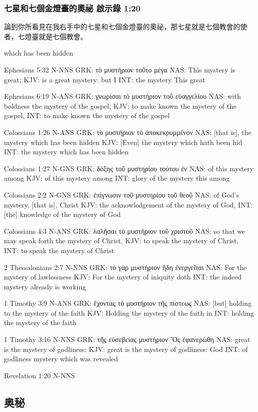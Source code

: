 \subsubsection{七星和七個金燈臺的奧祕 啟示錄 1:20}
論到你所看見在我右手中的七星和七個金燈臺的奧祕，那七星就是七個教會的使者，七燈臺就是七個教會。
 
  which has been hidden

Ephesians 5:32 N-NNS
GRK: τὸ μυστήριον τοῦτο μέγα
NAS: This mystery is great;
KJV: is a great mystery: but I
INT: the mystery This great

Ephesians 6:19 N-ANS
GRK: γνωρίσαι τὸ μυστήριον τοῦ εὐαγγελίου
NAS: with boldness the mystery of the gospel,
KJV: to make known the mystery of the gospel,
INT: to make known the mystery of the gospel

Colossians 1:26 N-ANS
GRK: τὸ μυστήριον τὸ ἀποκεκρυμμένον
NAS: [that is], the mystery which has been hidden
KJV: [Even] the mystery which hath been hid
INT: the mystery which has been hidden

Colossians 1:27 N-GNS
GRK: δόξης τοῦ μυστηρίου τούτου ἐν
NAS: of this mystery among
KJV: of this mystery among
INT: glory of the mystery this among

Colossians 2:2 N-GNS
GRK: ἐπίγνωσιν τοῦ μυστηρίου τοῦ θεοῦ
NAS: of God's mystery, [that is], Christ
KJV: the acknowledgement of the mystery of God,
INT: [the] knowledge of the mystery of God

Colossians 4:3 N-ANS
GRK: λαλῆσαι τὸ μυστήριον τοῦ χριστοῦ
NAS: so that we may speak forth the mystery of Christ,
KJV: to speak the mystery of Christ,
INT: to speak the mystery of Christ

2 Thessalonians 2:7 N-NNS
GRK: τὸ γὰρ μυστήριον ἤδη ἐνεργεῖται
NAS: For the mystery of lawlessness
KJV: For the mystery of iniquity doth
INT: the indeed mystery already is working

1 Timothy 3:9 N-ANS
GRK: ἔχοντας τὸ μυστήριον τῆς πίστεως
NAS: [but] holding to the mystery of the faith
KJV: Holding the mystery of the faith in
INT: holding the mystery of the faith

1 Timothy 3:16 N-NNS
GRK: τῆς εὐσεβείας μυστήριον Ὃς ἐφανερώθη
NAS: great is the mystery of godliness:
KJV: great is the mystery of godliness: God
INT: of godliness mystery which was revealed

Revelation 1:20 N-NNS 

\subsection{奥秘}
